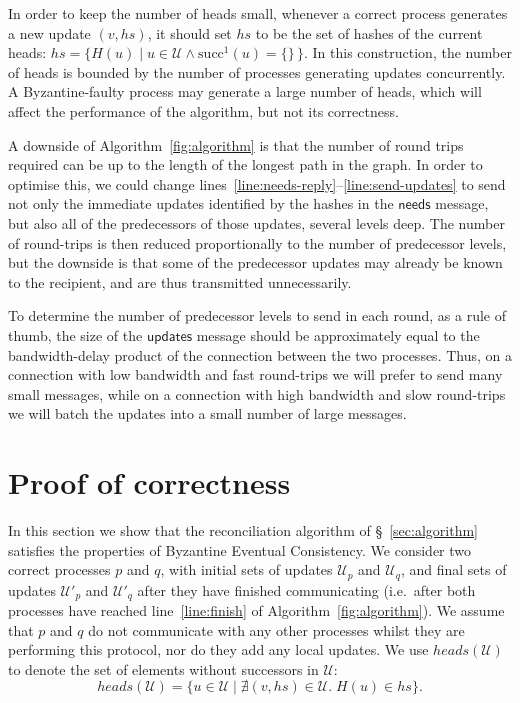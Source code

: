 \documentclass[a4paper,anonymous,USenglish]{lipics-v2019}
\begin{document}
In order to keep the number of heads small, whenever a correct process generates a new update $(v, \mathit{hs})$, it should set $\mathit{hs}$ to be the set of hashes of the current heads:
$\mathit{hs} = \{H(u) \mid u \in \mathcal{U} \wedge \mathrm{succ}^1(u) = \{\}\,\}$.
In this construction, the number of heads is bounded by the number of processes generating updates concurrently.
A Byzantine-faulty process may generate a large number of heads, which will affect the performance of the algorithm, but not its correctness.

A downside of Algorithm~\ref{fig:algorithm} is that the number of round trips required can be up to the length of the longest path in the graph.
In order to optimise this, we could change lines~\ref{line:needs-reply}--\ref{line:send-updates} to send not only the immediate updates identified by the hashes in the $\mathsf{needs}$ message, but also all of the predecessors of those updates, several levels deep.
The number of round-trips is then reduced proportionally to the number of predecessor levels, but the downside is that some of the predecessor updates may already be known to the recipient, and are thus transmitted unnecessarily.

To determine the number of predecessor levels to send in each round, as a rule of thumb, the size of the $\mathsf{updates}$ message should be approximately equal to the bandwidth-delay product of the connection between the two processes.
Thus, on a connection with low bandwidth and fast round-trips we will prefer to send many small messages, while on a connection with high bandwidth and slow round-trips we will batch the updates into a small number of large messages.


\section{Proof of correctness}\label{sec:proof}

In this section we show that the reconciliation algorithm of \S~\ref{sec:algorithm} satisfies the properties of Byzantine Eventual Consistency.
We consider two correct processes $p$ and $q$, with initial sets of updates $\mathcal{U}_p$ and $\mathcal{U}_q$, and final sets of updates $\mathcal{U}'_p$ and $\mathcal{U}'_q$ after they have finished communicating (i.e.\ after both processes have reached line~\ref{line:finish} of Algorithm~\ref{fig:algorithm}).
We assume that $p$ and $q$ do not communicate with any other processes whilst they are performing this protocol, nor do they add any local updates.
We use $\mathit{heads}(\mathcal{U})$ to denote the set of elements without successors in $\mathcal{U}$:
\[ \mathit{heads}(\mathcal{U}) = \{u \in \mathcal{U} \mid \nexists (v, \mathit{hs}) \in \mathcal{U}.\; H(u) \in \mathit{hs}\}. \]
\end{document}
